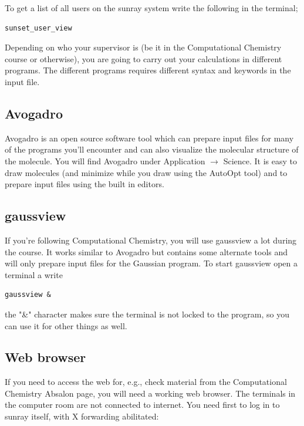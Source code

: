 \documentclass{article}
\begin{document}
To get a list of all users on the sunray system write the following in the terminal;

\begin{lstlisting}
sunset_user_view
\end{lstlisting}


Depending on who your supervisor is (be it in the Computational Chemistry course or otherwise), you are going to carry out your calculations in different programs.
The different programs requires different syntax and keywords in the input file.\\

\subsection*{Avogadro}

Avogadro is an open source software tool which can prepare input files for many of the programs you'll encounter and can also visualize the molecular structure of the molecule.
You will find Avogadro under Application $\rightarrow$ Science.
It is easy to draw molecules (and minimize while you draw using the AutoOpt tool) and to prepare input files using the built in editors.

\subsection*{gaussview}

If you're following Computational Chemistry, you will use gaussview a lot during the course.
It works similar to Avogadro but contains some alternate tools and will only prepare input files for the Gaussian program.
To start gaussview open a terminal a write
\begin{lstlisting}
gaussview &
\end{lstlisting}

the "\&" character makes sure the terminal is not locked to the program, so you can use it for other things as well.


\subsection*{Web browser}

If you need to access the web for, e.g., check material from the Computational Chemistry Absalon page, you will need a working web browser.
The terminals in the computer room are not connected to internet. You need first to log in to sunray itself, with X forwarding abilitated:
\end{document}
